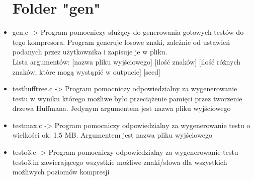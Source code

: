 \documentclass[]{article}
\begin{document}
\begin{itemize}
\section{Folder "gen"}\label{header-n231}
\item
gen.c -> Program pomocniczy służący do generowania gotowych testów do tego kompresora. Program generuje losowe znaki, zależnie od ustawień podanych przez użytkownika i zapisuje je w pliku.\\ Lista argumentów: [nazwa pliku wyjściowego] [ilość znaków] [ilość różnych znaków, które mogą wystąpić w outpucie] [seed]
\item
testhufftree.c -> Program pomocniczy odpowiedzialny za wygenerowanie testu w wyniku którego możliwe było przeciążenie pamięci przez tworzenie drzewa Huffmana. Jedynym argumentem jest nazwa pliku wyjściowego
\item
testmax.c -> Program pomocniczy odpowiedzialny za wygenerowanie testu o wielkości ok. 1.5 MB. Argumentem jest nazwa pliku wyjściowego
\item
testo3.c -> Program pomocniczy odpowiedzialny za wygenerowanie testu testo3.in zawierającego wszystkie możliwe znaki/słowa dla wszystkich możliwych poziomów kompresji

\end{itemize}
\end{document}
